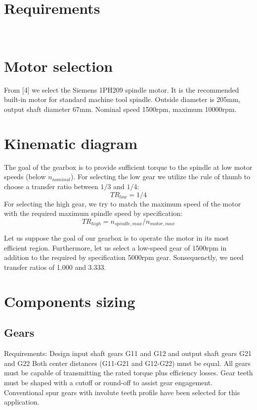 \documentclass{article}
\begin{document}
\section{Requirements}
          \\


\section{Motor selection}
From [4] we select the Siemens 1PH209 spindle motor.
It is the recommended built-in motor for standard machine tool spindle.
Outside diameter is 205mm, output shaft diameter 67mm.
Nominal speed 1500rpm, maximum 10000rpm.

\section{Kinematic diagram} %
The goal of the gearbox is to provide sufficient torque to the spindle at low motor speeds (below $n_{nominal}$).
For selecting the low gear we utilize the rule of thumb to choose a transfer ratio between $1/3$ and $1/4$:
$$ TR_{low} = 1/4 $$
For selecting the high gear, we try to match the maximum speed of the motor with the required maximum spindle speed by specification:
$$ TR_{high} = n_{spindle, max} / n_{motor, max} $$

Let us suppose the goal of our gearbox is to operate the motor in its most efficient region.
Furthermore, let us select a low-speed gear of 1500rpm in addition to the required by specification 5000rpm gear.
Sonsequenctly, we need transfer ratios of 1.000 and 3.333.

\section{Components sizing}
\subsection{Gears}
Requirements: Design input shaft gears G11 and G12 and output shaft gears G21 and G22
Both center distances (G11-G21 and G12-G22) must be equal.
All gears must be capable of transmitting the rated torque  plus efficiency losses.
Gear teeth must be shaped with a cutoff or round-off to assist gear engagement.
Conventional spur gears with involute teeth profile have been selected for this application.
\end{document}
